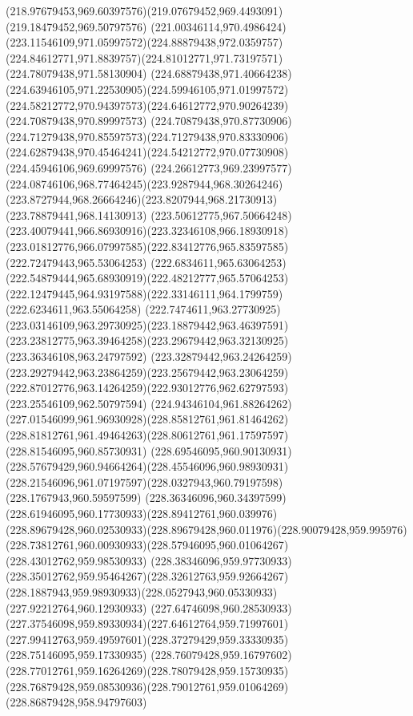 {{\curveto(218.97679453,969.60397576)(219.07679452,969.4493091)(219.18479452,969.50797576)
\curveto(221.00346114,970.4986424)(223.11546109,971.05997572)(224.88879438,972.0359757)
\curveto(224.84612771,971.8839757)(224.81012771,971.73197571)(224.78079438,971.58130904)
\curveto(224.68879438,971.40664238)(224.63946105,971.22530905)(224.59946105,971.01997572)
\curveto(224.58212772,970.94397573)(224.64612772,970.90264239)(224.70879438,970.89997573)
\curveto(224.70879438,970.87730906)(224.71279438,970.85597573)(224.71279438,970.83330906)
\curveto(224.62879438,970.45464241)(224.54212772,970.07730908)(224.45946106,969.69997576)
\curveto(224.26612773,969.23997577)(224.08746106,968.77464245)(223.9287944,968.30264246)
\curveto(223.8727944,968.26664246)(223.8207944,968.21730913)(223.78879441,968.14130913)
\curveto(223.50612775,967.50664248)(223.40079441,966.86930916)(223.32346108,966.18930918)
\curveto(223.01812776,966.07997585)(222.83412776,965.83597585)(222.72479443,965.53064253)
\curveto(222.6834611,965.63064253)(222.54879444,965.68930919)(222.48212777,965.57064253)
\curveto(222.12479445,964.93197588)(222.33146111,964.1799759)(222.6234611,963.55064258)
\curveto(222.7474611,963.27730925)(223.03146109,963.29730925)(223.18879442,963.46397591)
\curveto(223.23812775,963.39464258)(223.29679442,963.32130925)(223.36346108,963.24797592)
\curveto(223.32879442,963.24264259)(223.29279442,963.23864259)(223.25679442,963.23064259)
\curveto(222.87012776,963.14264259)(222.93012776,962.62797593)(223.25546109,962.50797594)
\curveto(224.94346104,961.88264262)(227.01546099,961.96930928)(228.85812761,961.81464262)
\curveto(228.81812761,961.49464263)(228.80612761,961.17597597)(228.81546095,960.85730931)
\curveto(228.69546095,960.90130931)(228.57679429,960.94664264)(228.45546096,960.98930931)
\curveto(228.21546096,961.07197597)(228.0327943,960.79197598)(228.1767943,960.59597599)
\curveto(228.36346096,960.34397599)(228.61946095,960.17730933)(228.89412761,960.039976)
\curveto(228.89679428,960.02530933)(228.89679428,960.011976)(228.90079428,959.995976)
\curveto(228.73812761,960.00930933)(228.57946095,960.01064267)(228.43012762,959.98530933)
\curveto(228.38346096,959.97730933)(228.35012762,959.95464267)(228.32612763,959.92664267)
\curveto(228.1887943,959.98930933)(228.0527943,960.05330933)(227.92212764,960.12930933)
\curveto(227.64746098,960.28530933)(227.37546098,959.89330934)(227.64612764,959.71997601)
\curveto(227.99412763,959.49597601)(228.37279429,959.33330935)(228.75146095,959.17330935)
\curveto(228.76079428,959.16797602)(228.77012761,959.16264269)(228.78079428,959.15730935)
\curveto(228.76879428,959.08530936)(228.79012761,959.01064269)(228.86879428,958.94797603)
}}
